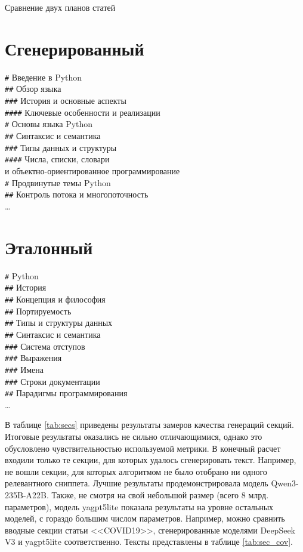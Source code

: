 \documentclass{article}
\theoremstyle{definition}
\theoremstyle{plain}
\begin{document}
\begin{table}[ht!]
\centering
\caption{Сравнение двух планов статей}
\label{tab:headlines}
\begin{multicols}{2}
\section*{Сгенерированный}
\small\setlength{\parskip}{2pt}\setlength{\parindent}{0pt}
\texttt{\#} Введение в Python\\
\texttt{\#\#} Обзор языка\\
\texttt{\#\#\#} История и основные аспекты\\
\texttt{\#\#\#\#} Ключевые особенности и реализации\\
\texttt{\#} Основы языка Python\\
\texttt{\#\#} Синтаксис и семантика\\
\texttt{\#\#\#} Типы данных и структуры\\
\texttt{\#\#\#\#} Числа, списки, словари \\ и объектно-ориентированное программирование\\
\texttt{\#} Продвинутые темы Python\\
\texttt{\#\#} Контроль потока и многопоточность\\
\dots
\columnbreak
\section*{Эталонный}
\small\setlength{\parskip}{2pt}\setlength{\parindent}{0pt}
\texttt{\#} Python\\
\texttt{\#\#} История\\
\texttt{\#\#} Концепция и философия\\
\texttt{\#\#} Портируемость\\
\texttt{\#\#} Типы и структуры данных\\
\texttt{\#\#} Синтаксис и семантика\\
\texttt{\#\#\#} Система отступов\\
\texttt{\#\#\#} Выражения\\
\texttt{\#\#\#} Имена\\
\texttt{\#\#\#} Строки документации\\
\texttt{\#\#} Парадигмы программирования\\
\dots
\end{multicols}
\end{table}


В таблице \ref{tab:secs} приведены результаты замеров качества генераций секций. Итоговые результаты оказались не сильно отличающимися, однако это обусловлено чувствительностью используемой метрики.
В конечный расчет входили только те секции, для которых удалось сгенерировать текст. Например, не вошли секции, для которых алгоритмом не было отобрано ни одного релевантного сниппета. Лучшие результаты 
продемонстрировала модель Qwen3-235B-A22B. Также, не смотря на свой небольшой размер (всего 8 млрд. параметров), модель yagpt5lite показала результаты на уровне остальных моделей, с гораздо большим числом параметров.
Например, можно сравнить вводные секции статьи <<COVID19>>, сгенерированные моделями DeepSeek V3 и yagpt5lite соответственно. Тексты представлены в таблице \ref{tab:sec_cov}.
\end{document}
